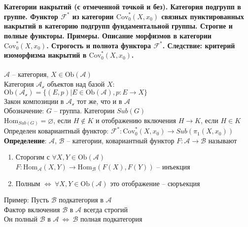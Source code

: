\newpage
\section{}
	\textbf{Категории накрытий (с отмеченной точкой и без). Категория подгрупп в группе. Функтор $\mathcal{F}^{*}$ из категории $\text{Cov}_0^{*}(X, x_0)$ связных пунктированных накрытий в категорию подгрупп фундаментальной группы. Строгие и полные функторы. Примеры. Описание морфизмов в категории $\text{Cov}_0^{*} (X,x_0)$. Строгость и полнота функтора $\mathcal{F}^{*}$. Следствие: критерий изоморфизма накрытий в $\text{Cov}_0^{*} (X,x_0)$.}\\
	\\
	$\mathcal{A}$ -- категория, $X \in \text{Ob}(\mathcal{A})$\\
	Категория $\mathcal{A_x}$ объектов над базой $X$: 
	$\text{Ob}(\mathcal{A_x}) = \{(E,p)|E \in \text{Ob}(\mathcal{A}), p: E\rightarrow X\}$\\
	Закон композиции в $\mathcal{A_x}$ тот же, что и в $\mathcal{A}$\\
	Обозначение: $G$ -- группа. Категории $Sub(G)$\\
	$\text{Hom}_{Sub(G)} = \varnothing$, если $H \notin K$ и отображению включения $H \rightarrow K$, если $H \in K$\\
	Определен ковариантный функтор: $\mathcal{F}^{*}: \text{Cov}_0^{*}(X, x_0)\rightarrow Sub({\pi}_1(X, x_0))$\\
	\textbf{Определение}: $\mathcal{A}$, $\mathcal{B}$ -- категории, ковариантный функтор $F: \mathcal{A}\rightarrow\mathcal{B}$ называют\:\\
	\begin{enumerate}
	\item Сторогим с $\forall X, Y \in \text{Ob}(\mathcal{A})$\\
		$F: \text{Hom}_{\mathcal{A}}(X, Y) \rightarrow \text{Hom}_{\mathcal{B}}(F(X), F(Y))$ -- инъекция
	\item Полным $\Leftrightarrow\ \forall X, Y \in \text{Ob}(\mathcal{A})$ это отображение -- сюръекция
	\end{enumerate}
	Пример: Пусть $\mathcal{B}$ подкатегория в $\mathcal{A}$\\
	Фактор включения $\mathcal{B}$ в $\mathcal{A}$ всегда строгий\\
	Он полный $\mathcal{B}$ в $\mathcal{A}\ \Leftrightarrow\ \mathcal{B}$ полная подкатегория\\
